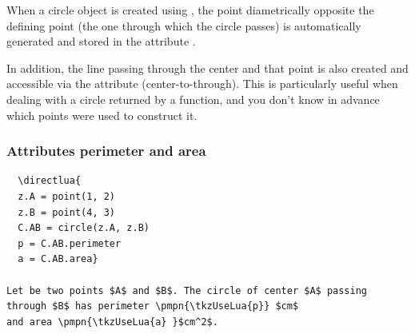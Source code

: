 When a circle object is created using , the point diametrically opposite the defining point (the one through which the circle passes) is automatically generated and stored in the attribute .

\medskip

In addition, the line passing through the center and that point is also created and accessible via the attribute  (center-to-through). This is particularly useful when dealing with a circle returned by a function, and you don't know in advance which points were used to construct it.

\vspace{1em}

\begin{tkzexample}[latex=7cm]
\begin{center}
\end{center}
\end{tkzexample}


\subsubsection{Attributes perimeter and area}
\label{ssub:attributes_perimeter_and_area}

 \let\pmpn\pgfmathprintnumber

\begin{mybox}
\begin{verbatim}
  \directlua{
  z.A = point(1, 2)
  z.B = point(4, 3)
  C.AB = circle(z.A, z.B)
  p = C.AB.perimeter
  a = C.AB.area}

Let be two points $A$ and $B$. The circle of center $A$ passing
through $B$ has perimeter \pmpn{\tkzUseLua{p}} $cm$
and area \pmpn{\tkzUseLua{a} }$cm^2$.
\end{verbatim}
\end{mybox}


